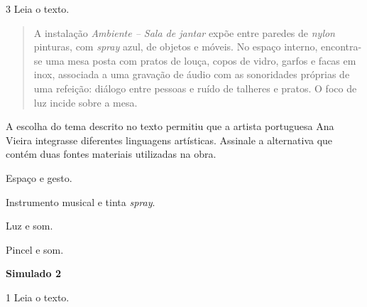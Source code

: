 \num{3} Leia o texto.

\begin{quote}
A instalação \emph{Ambiente -- Sala de jantar} expõe entre paredes de
\textit{nylon} pinturas, com \textit{spray} azul, de objetos e móveis. No espaço interno,
encontra-se uma mesa posta com pratos de louça, copos de vidro, garfos e
facas em inox, associada a uma gravação de áudio com as sonoridades
próprias de uma refeição: diálogo entre pessoas e ruído de talheres e
pratos. O foco de luz incide sobre a mesa.

\end{quote}

A escolha do tema descrito no texto permitiu que a
artista portuguesa Ana Vieira integrasse diferentes linguagens
artísticas. Assinale a alternativa que contém duas fontes materiais
utilizadas na obra.

\begin{escolha}
\item
  Espaço e gesto.
\item
  Instrumento musical e tinta \textit{spray}.
\item
  Luz e som.
\item
  Pincel e som.
\end{escolha}



\textbf{Simulado 2}

\num{1} Leia o texto.

